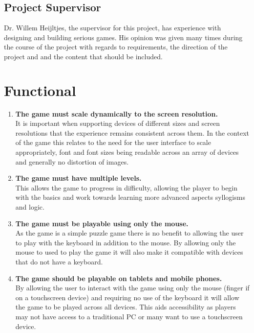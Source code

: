 \documentclass[12pt,a4paper]{report}
\begin{document}
\subsection{Project Supervisor}
Dr. Willem Heijltjes, the supervisor for this project, has experience with designing and building serious games. His opinion was given many times during the course of the project with regards to requirements, the direction of the project and and the content that should be included.

 \section{Functional}
   \begin{enumerate}[label*=\arabic*]
   
   
   
   
            \item \textbf{The game must scale dynamically to the screen resolution.}\\
It is important when supporting devices of different sizes and screen resolutions that the experience remains consistent across them. In the context of the game this relates to the need for the user interface to scale appropriately, font and font sizes being readable across an array of devices and generally no distortion of images.

            \item \textbf{The game must have multiple levels.}\\
This allows the game to progress in difficulty, allowing the player to begin with the basics and work towards learning more advanced aspects syllogisms and logic.

            \item \textbf{The game must be playable using only the mouse.}\\
As the game is a simple puzzle game there is no benefit to allowing the user to play with the keyboard in addition to the mouse. By allowing only the mouse to used to play the game it will also make it compatible with devices that do not have a keyboard.

 \item \textbf{The game should be playable on tablets and mobile phones.}\\
By allowing the user to interact with the game using only the mouse (finger if on a touchscreen device) and requiring no use of the keyboard it will allow the game to be played across all devices. This aids accessibility as players may not have access to a traditional PC or many want to use a touchscreen device.	



\end{enumerate}
\end{document}
